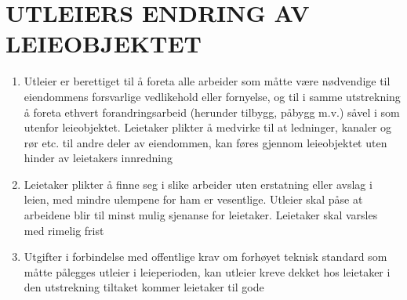 \section{UTLEIERS ENDRING AV LEIEOBJEKTET}


    \begin{enumerate}


        \item Utleier er berettiget til å foreta alle arbeider som måtte være nødvendige til eiendommens forsvarlige
        vedlikehold eller fornyelse, og til i samme utstrekning å foreta ethvert forandringsarbeid (herunder
        tilbygg, påbygg m.v.) såvel i som utenfor leieobjektet. Leietaker plikter å medvirke til at ledninger,
        kanaler og rør etc. til andre deler av eiendommen, kan føres gjennom leieobjektet uten hinder av
        leietakers innredning

        \item Leietaker plikter å finne seg i slike arbeider uten erstatning eller avslag i leien, med mindre ulempene
        for ham er vesentlige. Utleier skal påse at arbeidene blir til minst mulig sjenanse for leietaker. Leietaker
        skal varsles med rimelig frist

        \item Utgifter i forbindelse med offentlige krav om forhøyet teknisk standard som måtte pålegges utleier i
        leieperioden, kan utleier kreve dekket hos leietaker i den utstrekning tiltaket kommer leietaker til gode


    \end{enumerate}
